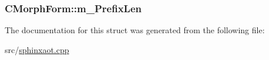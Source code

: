 \hypertarget{structCMorphForm_ae19b5cf577a953dd80b68071e4164dfb}{
\subsubsection[{m\-\_\-\-Prefix\-Len}]{ C\-Morph\-Form\-::m\-\_\-\-Prefix\-Len}}\label{structCMorphForm_ae19b5cf577a953dd80b68071e4164dfb}


The documentation for this struct was generated from the following file\-:\begin{DoxyCompactItemize}
\item 
src/\hyperlink{sphinxaot_8cpp}{sphinxaot.\-cpp}\end{DoxyCompactItemize}
